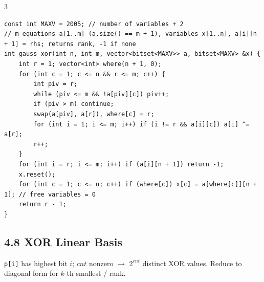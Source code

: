 \documentclass[8pt]{extarticle}
\begin{document}
\begin{multicols*}{3}
\begin{lstlisting}
const int MAXV = 2005; // number of variables + 2
// m equations a[1..m] (a.size() == m + 1), variables x[1..n], a[i][n + 1] = rhs; returns rank, -1 if none
int gauss_xor(int n, int m, vector<bitset<MAXV>> a, bitset<MAXV> &x) {
    int r = 1; vector<int> where(n + 1, 0);
    for (int c = 1; c <= n && r <= m; c++) {
        int piv = r;
        while (piv <= m && !a[piv][c]) piv++;
        if (piv > m) continue;
        swap(a[piv], a[r]), where[c] = r;
        for (int i = 1; i <= m; i++) if (i != r && a[i][c]) a[i] ^= a[r];
        r++;
    }
    for (int i = r; i <= m; i++) if (a[i][n + 1]) return -1;
    x.reset();
    for (int c = 1; c <= n; c++) if (where[c]) x[c] = a[where[c]][n + 1]; // free variables = 0
    return r - 1;
}
\end{lstlisting}

\subsection*{4.8 XOR Linear Basis}

\texttt{p[i]} has highest bit $i$; $cnt$ nonzero $\to$ $2^{cnt}$ distinct XOR values. Reduce to diagonal form for $k$-th smallest / rank.


\end{multicols*}
\end{document}
